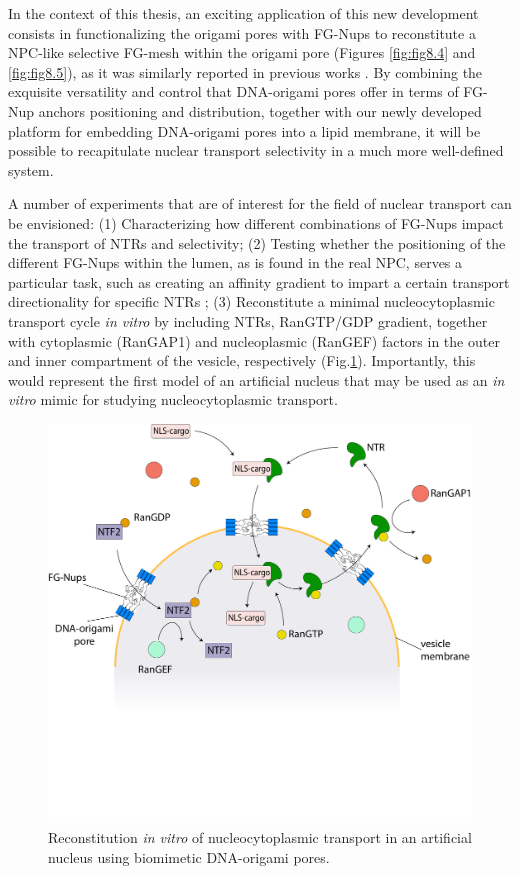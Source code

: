 \noindent In the context of this thesis, an exciting application of this new development consists in functionalizing the origami pores with FG-Nups to reconstitute a NPC-like selective FG-mesh within the origami pore (Figures \ref{fig:fig8.4} and \ref{fig:fig8.5}), as it was similarly reported in previous works \cite{Ketterer2018,Fisher2018}. By combining the exquisite versatility and control that DNA-origami pores offer in terms of FG-Nup anchors positioning and distribution, together with our newly developed platform for embedding DNA-origami pores into a lipid membrane, it will be possible to recapitulate nuclear transport selectivity in a much more well-defined system.

A number of experiments that are of interest for the field of nuclear transport can be envisioned: (1) Characterizing how different combinations of FG-Nups impact the transport of NTRs and selectivity; (2) Testing whether the positioning of the different FG-Nups within the lumen, as is found in the real NPC, serves a particular task, such as creating an affinity gradient to impart a certain transport directionality for specific NTRs \cite{Pyhtila2003}; (3) Reconstitute a minimal nucleocytoplasmic transport cycle \emph{in vitro} by including NTRs, RanGTP/GDP gradient, together with cytoplasmic (RanGAP1) and nucleoplasmic (RanGEF) factors in the outer and inner compartment of the vesicle, respectively (Fig.\ref{fig:fig8.6}). Importantly, this would represent the first model of an artificial nucleus that may be used as an \emph{in vitro} mimic for studying nucleocytoplasmic transport.

\begin{figure}[!htbp]
	\centering
	\includegraphics[width=1\linewidth]{figures/Figure8.6.pdf}
	\caption{Reconstitution \emph{in vitro} of nucleocytoplasmic transport in an artificial nucleus using biomimetic DNA-origami pores.}
	\label{fig:fig8.6}
\end{figure}

